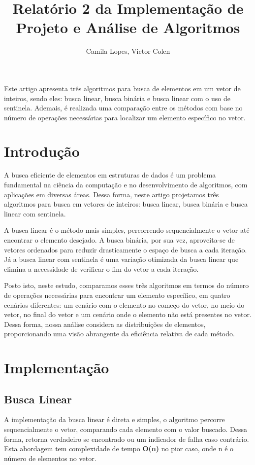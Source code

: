 \documentclass[12pt]{article}
\title{Relatório 2 da Implementação de Projeto e Análise de Algoritmos}
\author{Camila Lopes\inst{1}, Victor Colen\inst{1} }
\begin{document}
 

\maketitle

\begin{resumo} 
 Este artigo apresenta três algoritmos para busca de elementos em um vetor de inteiros, sendo eles: busca linear, busca binária e busca linear com o uso de sentinela. Ademais, é realizada uma comparação entre os métodos com base no número de operações necessárias para localizar um elemento específico no vetor. 
\end{resumo}


\section{Introdução}
A busca eficiente de elementos em estruturas de dados é um problema fundamental na ciência da computação e no desenvolvimento de algoritmos, com aplicações em diversas áreas. Dessa forma, neste artigo projetamos três algoritmos para busca em vetores de inteiros: busca linear, busca binária e busca linear com sentinela. 

A busca linear é o método mais simples, percorrendo sequencialmente o vetor até encontrar o elemento desejado. A busca binária, por sua vez, aproveita-se de vetores ordenados para reduzir drasticamente o espaço de busca a cada iteração. Já a busca linear com sentinela é uma variação otimizada da busca linear que elimina a necessidade de verificar o fim do vetor a cada iteração.

Posto isto, neste estudo, comparamos esses três algoritmos em termos do número de operações necessárias para encontrar um elemento específico, em quatro cenários diferentes: um cenário com o elemento no começo do vetor, no meio do vetor, no final do vetor e um cenário onde o elemento não está presentes no vetor. Dessa forma, nossa análise considera as distribuições de elementos, proporcionando uma visão abrangente da eficiência relativa de cada método.

\section{Implementação}

\subsection{Busca Linear}
A implementação da busca linear é direta e simples, o algoritmo percorre sequencialmente o vetor, comparando cada elemento com o valor buscado. Dessa forma, retorna verdadeiro se encontrado ou um indicador de falha caso contrário. Esta abordagem tem complexidade de tempo \textbf{O(n)} no pior caso, onde n é o número de elementos no vetor.
\end{document}
